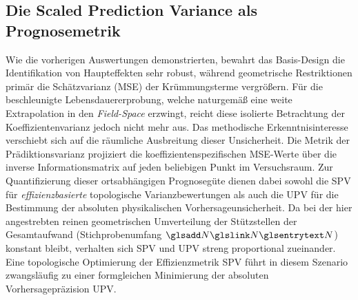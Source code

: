\subsection{Die Scaled Prediction Variance als Prognosemetrik} \label{subsec:spv_metrik}
Wie die vorherigen Auswertungen demonstrierten, bewahrt das Basis-Design die Identifikation von Haupteffekten sehr robust, während geometrische Restriktionen primär die Schätzvarianz (\ac{MSE}) der Krümmungsterme vergrößern.
Für die beschleunigte Lebensdauererprobung, welche naturgemäß eine weite Extrapolation in den \textit{Field-Space} erzwingt, reicht diese isolierte Betrachtung der Koeffizientenvarianz jedoch nicht mehr aus.
Das methodische Erkenntnisinteresse verschiebt sich auf die räumliche Ausbreitung dieser Unsicherheit.
Die Metrik der Prädiktionsvarianz projiziert die koeffizientenspezifischen \ac{MSE}-Werte über die inverse Informationsmatrix auf jeden beliebigen Punkt im Versuchsraum.
Zur Quantifizierung dieser ortsabhängigen Prognosegüte dienen dabei sowohl die \ac{SPV} für \textit{effizienzbasierte} topologische Varianzbewertungen als auch die \ac{UPV} für die Bestimmung der absoluten physikalischen Vorhersageunsicherheit.
Da bei der hier angestrebten reinen geometrischen Umverteilung der Stützstellen der Gesamtaufwand (Stichprobenumfang $\sym{N}$) konstant bleibt, verhalten sich \ac{SPV} und \ac{UPV} streng proportional zueinander.
Eine topologische Optimierung der Effizienzmetrik \ac{SPV} führt in diesem Szenario zwangsläufig zu einer formgleichen Minimierung der absoluten Vorhersagepräzision \ac{UPV}.

